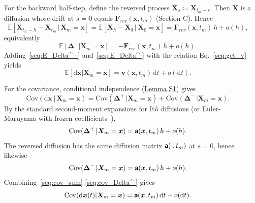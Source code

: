 For the backward half-step, define the reversed process $\bar{\bm{X}}_s\coloneq\bm{X}_{t_m-s}$. Then $\bar{\bm{X}}$ is a diffusion whose drift at $s=0$ equals $\bm{F}_{rev}(\bm{x},t_m)$ (Section C). Hence
\begin{equation*}
    \mathbb{E}\left[
    \bm{X}_{t_m-h}-\bm{X}_{t_m}\,|\,\bm{X}_m=\bm{x}
    \right]=
    \mathbb{E}\left[
    \bar{\bm{X}}_h-\bar{\bm{X}}_0\,|\,\bar{\bm{X}}_0=\bm{x}
    \right]=\bm{F}_{rev}(\bm{x},t_m)\,h+o(h),
\end{equation*}
equivalently 
\begin{equation}
    \mathbb{E}\left[\bm\Delta^-|\bm{X}_m=\bm{x}\right]=-\bm{F}_{rev}(\bm{x},t_m)\,h+o(h).
    \label{seq:E_Delta^-}
\end{equation} 
Adding~\eqref{seq:E_Delta^+} and~\eqref{seq:E_Delta^-} with the relation Eq.~\eqref{seq:get_v} yields
\begin{equation}
    \mathbb{E}[\mathrm{d}\bm{x}|\bm{X}_m=\bm{x}]=\bm{v}(\bm{x},t_m)\,\mathrm{d}t+o(\mathrm{d}t).
    \label{seq:cal_dx_xm}
\end{equation}

For the covariance, conditional independence (\hyperlink{lem:S1}{Lemma S1}) gives
\begin{equation}
    \mathrm{Cov}(\mathrm{d}\bm{x}\,|\,\bm{X}_m=\bm{x})=
    \mathrm{Cov}(\bm\Delta^+\,|\bm{X}_m=\bm{x})
    +\mathrm{Cov}(\bm\Delta^-\,|\bm{X}_m=\bm{x}).
    \label{seq:cov_sum}
\end{equation}
By the standard second-moment expansions for Itô diffusions (or Euler-Maruyama with frozen coefficients~\cite{maruyama1955continuous,kloeden1992numerical}),
\begin{equation}
    \mathrm{Cov}(\bm\Delta^+\,|\bm{X}_m=\bm{x})
    =\boldsymbol{\mathsf{a}}(\bm{x},t_m)\,h+o(h).
    \label{seq:cov_Delta^+}
\end{equation}
The reversed diffusion has the same diffusion matrix $\boldsymbol{\mathsf{a}}(\cdot,t_m)$ at $s=0$, hence likewise
\begin{equation}
    \mathrm{Cov}(\bm\Delta^-\,|\bm{X}_m=\bm{x})
    =\boldsymbol{\mathsf{a}}(\bm{x},t_m)\,h+o(h).
    \label{seq:cov_Delta^-}
\end{equation}
Combining~\eqref{seq:cov_sum}-\eqref{seq:cov_Delta^-} gives
\begin{equation}
    \mathrm{Cov}(\mathrm{d}\bm{x}(t)|\bm{X}_m=\bm{x})=
    \boldsymbol{\mathsf{a}}(\bm{x},t_m)\,\mathrm{d}t+o(\mathrm{d}t).
    \label{seq:cal_cov_dx_xm}
\end{equation}



